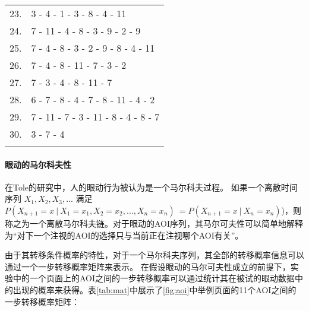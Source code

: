 \begin{table}[H]
\begin{tabular}{ll}
    23.& 3 - 4 - 1 - 3 - 8 - 4 - 11\\
    24.& 7 - 11 - 4 - 8 - 3 - 9 - 2 - 9\\
    25.& 7 - 4 - 8 - 3 - 2 - 9 - 8 - 4 - 11\\
    26.& 7 - 4 - 8 - 11 - 7 - 3 - 2 \\
    27.& 7 - 3 - 4 - 8 - 11 - 7\\
    28.& 6 - 7 - 8 - 4 - 7 - 8 - 11 - 4 - 2\\
    29.& 7 - 11 - 7 - 3 - 11 - 8 - 4 - 8 - 7\\
    30.& 3 - 7 - 4\\
    \\
  \end{tabular}
\end{table}

\paragraph{眼动的马尔科夫性}
在Tole的研究中，人的眼动行为被认为是一个马尔科夫过程。
如果一个离散时间序列 $X_1,X_2,X_3,...$ 满足$P(X_{n+1}=x~|~X_1=x_1,X_2=x_2,...,X_n=x_n)~=P(X_{n+1}=x~|~X_n=x_n)$)，则称之为一个离散马尔科夫链。对于眼动的AOI序列，其马尔可夫性可以简单地解释为“对下一个注视的AOI的选择只与当前正在注视哪个AOI有关”。

由于其转移条件概率的特性，对于一个马尔科夫序列，其全部的转移概率信息可以通过一个一步转移概率矩阵来表示。
在假设眼动的马尔可夫性成立的前提下，实验中的一个页面上的AOI之间的一步转移概率可以通过统计其在被试的眼动数据中的出现的概率来获得。表\ref{tab:mat}中展示了\ref{fig:aoi}中举例页面的11个AOI之间的一步转移概率矩阵：

